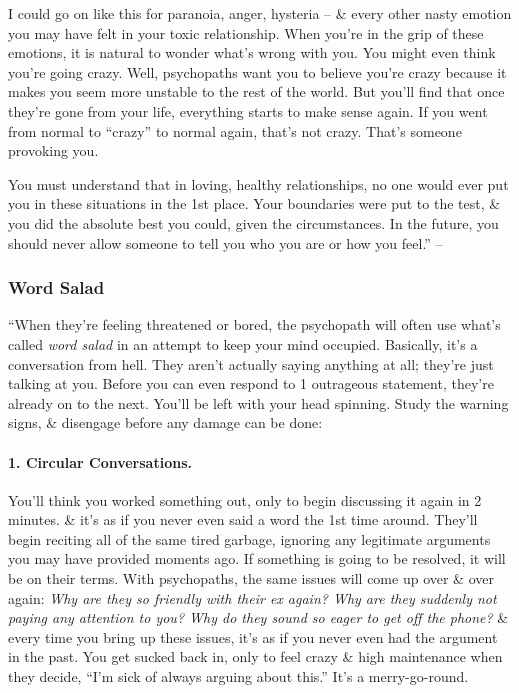 \documentclass{article}
\numberwithin{equation}{section}
\begin{document}
I could go on like this for paranoia, anger, hysteria -- \& every other nasty emotion you may have felt in your toxic relationship. When you're in the grip of these emotions, it is natural to wonder what's wrong with you. You might even think you're going crazy. Well, psychopaths want you to believe you're crazy because it makes you seem more unstable to the rest of the world. But you'll find that once they're gone from your life, everything starts to make sense again. If you went from normal to ``crazy'' to normal again, that's not crazy. That's someone provoking you.

You must understand that in loving, healthy relationships, no one would ever put you in these situations in the 1st place. Your boundaries were put to the test, \& you did the absolute best you could, given the circumstances. In the future, you should never allow someone to tell you who you are or how you feel.'' -- \cite[pp. 40--43]{MacKenzie2015}

\subsubsection{Word Salad}
``When they're feeling threatened or bored, the psychopath will often use what's called \textit{word salad} in an attempt to keep your mind occupied. Basically, it's a conversation from hell. They aren't actually saying anything at all; they're just talking at you. Before you can even respond to 1 outrageous statement, they're already on to the next. You'll be left with your head spinning. Study the warning signs, \& disengage before any damage can be done:

\paragraph{1. Circular Conversations.} You'll think you worked something out, only to begin discussing it again in 2 minutes. \& it's as if you never even said a word the 1st time around. They'll begin reciting all of the same tired garbage, ignoring any legitimate arguments you may have provided moments ago. If something is going to be resolved, it will be on their terms. With psychopaths, the same issues will come up over \& over again: \textit{Why are they so friendly with their ex again? Why are they suddenly not paying any attention to you? Why do they sound so eager to get off the phone?} \& every time you bring up these issues, it's as if you never even had the argument in the past. You get sucked back in, only to feel crazy \& high maintenance when they decide, ``I'm sick of always arguing about this.'' It's a merry-go-round.
\end{document}
